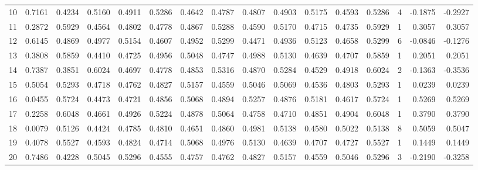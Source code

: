 \begin{tabular}{lrrrrrrrrrrrrrrr}
10  &      0.7161 &  0.4234 &  0.5160 &  0.4911 &  0.5286 &  0.4642 &  0.4787 &  0.4807 &  0.4903 &  0.5175 &   0.4593 &     0.5286 &      4 &                   -0.1875 &                    -0.2927 \\
11  &      0.2872 &  0.5929 &  0.4564 &  0.4802 &  0.4778 &  0.4867 &  0.5288 &  0.4590 &  0.5170 &  0.4715 &   0.4735 &     0.5929 &      1 &                    0.3057 &                     0.3057 \\
12  &      0.6145 &  0.4869 &  0.4977 &  0.5154 &  0.4607 &  0.4952 &  0.5299 &  0.4471 &  0.4936 &  0.5123 &   0.4658 &     0.5299 &      6 &                   -0.0846 &                    -0.1276 \\
13  &      0.3808 &  0.5859 &  0.4410 &  0.4725 &  0.4956 &  0.5048 &  0.4747 &  0.4988 &  0.5130 &  0.4639 &   0.4707 &     0.5859 &      1 &                    0.2051 &                     0.2051 \\
14  &      0.7387 &  0.3851 &  0.6024 &  0.4697 &  0.4778 &  0.4853 &  0.5316 &  0.4870 &  0.5284 &  0.4529 &   0.4918 &     0.6024 &      2 &                   -0.1363 &                    -0.3536 \\
15  &      0.5054 &  0.5293 &  0.4718 &  0.4762 &  0.4827 &  0.5157 &  0.4559 &  0.5046 &  0.5069 &  0.4536 &   0.4803 &     0.5293 &      1 &                    0.0239 &                     0.0239 \\
16  &      0.0455 &  0.5724 &  0.4473 &  0.4721 &  0.4856 &  0.5068 &  0.4894 &  0.5257 &  0.4876 &  0.5181 &   0.4617 &     0.5724 &      1 &                    0.5269 &                     0.5269 \\
17  &      0.2258 &  0.6048 &  0.4661 &  0.4926 &  0.5224 &  0.4878 &  0.5064 &  0.4758 &  0.4710 &  0.4851 &   0.4904 &     0.6048 &      1 &                    0.3790 &                     0.3790 \\
18  &      0.0079 &  0.5126 &  0.4424 &  0.4785 &  0.4810 &  0.4651 &  0.4860 &  0.4981 &  0.5138 &  0.4580 &   0.5022 &     0.5138 &      8 &                    0.5059 &                     0.5047 \\
19  &      0.4078 &  0.5527 &  0.4593 &  0.4824 &  0.4714 &  0.5068 &  0.4976 &  0.5130 &  0.4639 &  0.4707 &   0.4727 &     0.5527 &      1 &                    0.1449 &                     0.1449 \\
20  &      0.7486 &  0.4228 &  0.5045 &  0.5296 &  0.4555 &  0.4757 &  0.4762 &  0.4827 &  0.5157 &  0.4559 &   0.5046 &     0.5296 &      3 &                   -0.2190 &                    -0.3258 \\

\end{tabular}
